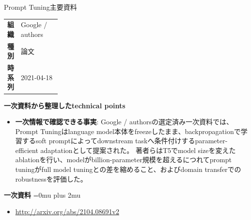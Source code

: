 \begin{technicalnote}{Prompt Tuning}{主要資料}
\begingroup
\begin{tabularx}{\linewidth}{@{}>{\bfseries}p{0.22\linewidth}X@{}}
組織 & Google / authors \\
種別 & 論文 \\
時系列 & 2021-04-18 \\
\end{tabularx}
\smallskip
\begin{minipage}{\linewidth}
{\bfseries 一次資料から整理したtechnical points}
\begin{itemize}[leftmargin=1.5em,itemsep=0.35em]
\item \textbf{一次情報で確認できる事実}: Google / authorsの選定済み一次資料では、Prompt Tuningはlanguage model本体をfreezeしたまま、backpropagationで学習するsoft promptによってdownstream taskへ条件付けするparameter-efficient adaptationとして提案された。 著者らはT5でmodel sizeを変えたablationを行い、modelがbillion-parameter規模を超えるにつれてprompt tuningがfull model tuningとの差を縮めること、およびdomain transferでのrobustnessを評価した。
\end{itemize}
\begin{minipage}{\linewidth}
\begin{samepage}
{\bfseries 一次資料}
\begingroup\sloppy
\Urlmuskip=0mu plus 2mu\relax
\begin{itemize}[leftmargin=1.5em,itemsep=0.25em]
\item {\scriptsize\url{http://arxiv.org/abs/2104.08691v2}}
\end{itemize}
\endgroup
\end{samepage}
\end{minipage}
\end{minipage}
\endgroup
\end{technicalnote}
\medskip

